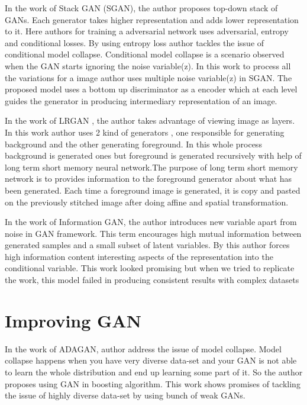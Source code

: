 In the work of Stack GAN (SGAN)\cite{stacked-gan}, the author proposes top-down stack of GANs. Each generator takes higher representation and adds lower representation to it. Here authors for training  a adversarial network uses adversarial, entropy and conditional losses. By using entropy loss author tackles the issue of conditional model collapse. Conditional model collapse  is a  scenario	observed	when	the	GAN	starts	ignoring the noise variable(z). In this work to process all the variations for a image author uses multiple noise variable(z) in SGAN. The proposed model uses a bottom up discriminator as a encoder which at each level guides the generator in producing intermediary representation of an image.

In the work of LRGAN \cite{LR-GAN}, the author takes advantage of viewing image as layers. In this work author uses 2 kind of generators , one responsible for generating background and the other generating foreground. In this whole process background is generated ones but foreground is generated recursively with help of long term short memory neural network\cite{hochreiter1997long}.The purpose of long term short memory network is to  provides information to the foreground generator about what has been generated. Each time a foreground image is generated, it is copy and pasted on the previously stitched image after doing affine and spatial transformation\cite{1506.02025}. 



In the work of Information GAN, the author introduces new variable apart from noise in GAN framework. This term encourages high mutual information between generated samples and a small subset of latent variables. By this author forces high information content interesting aspects of the representation into the conditional variable. This work looked promising but when we tried to replicate the work, this model failed in producing consistent results with complex datasets


\section{Improving GAN}

In the work of ADAGAN, author address the issue of model collapse. Model collapse happens when you have very diverse data-set and your GAN is not able to learn the whole distribution and end up learning some part of it. So the author proposes using GAN in boosting algorithm. This work shows promises of tackling the issue of highly diverse data-set by using bunch of weak GANs.
\par

